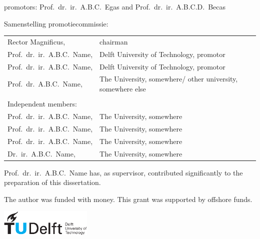 \begin{titlepage}
\noindent
 promotors:    Prof.\ dr.\ ir.\ A.B.C.\ Egas and Prof.\ dr.\ ir.\ A.B.C.D.\ Becas
\medskip
\medskip


\noindent Samenstelling promotiecommissie:

\medskip\noindent
\begin{tabular}{ll}
    Rector Magnificus, & chairman \\
    Prof.\ dr.\ ir.\  A.B.C.\ Name, &Delft University of Technology, promotor \\
    Prof.\ dr.\ ir.\  A.B.C.\ Name, &Delft University of Technology, promotor \\
    Prof.\ dr.\  A.B.C.\  Name, &The University, somewhere/ other university, somewhere else \\
\\
    Independent members:\\
    Prof.\ dr.\ ir.\  A.B.C.\ Name, & The University, somewhere\\
    Prof.\ dr.\ ir.\ A.B.C.\ Name, &The University, somewhere \\
    Prof.\ dr.\ ir.\ A.B.C.\ Name,  & The University, somewhere  \\
    Dr.\ ir.\ A.B.C.\ Name, & The University, somewhere
\end{tabular}

\medskip
\noindent Prof.\ dr.\ ir.\ A.B.C.\ Name has, as supervisor, contributed significantly to the preparation of this dissertation.

\medskip
\medskip\medskip
\medskip
\noindent The author was funded with money.
This grant was supported by offshore funds.
\vfill
\begin{center}
    \includegraphics[height=0.5in]{title/logos/tudelft}
    \hspace{2em}
\end{center}
\vfill
\noindent
\begin{tabular}{@{}p{}@{}p{}}


\end{tabular}
\end{titlepage}
